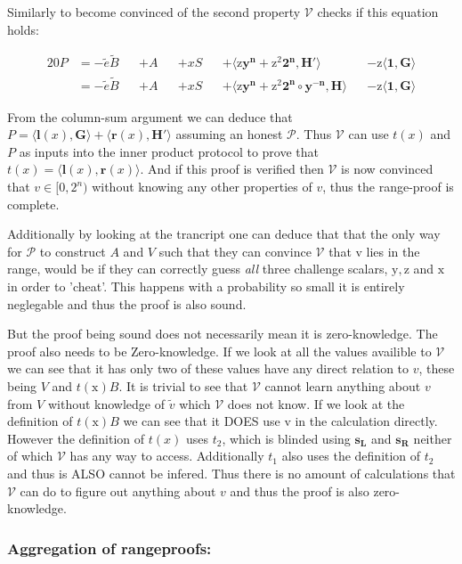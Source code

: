 \documentclass{article}
\newcommand{\eq}[1]{\begin{alignat*}{20}#1\end{alignat*}}
\renewcommand{\vec}[1]{\boldsymbol{#1}}
\newcommand{\ran}[1]{\mathrm{#1}}
\newcommand{\vecran}[1]{\mathbf{#1}}
\newcommand{\V}{\mathcal{V}}
\renewcommand{\P}{\mathcal{P}}
\newcommand{\tB}{\widetilde{B}}
\newcommand{\tv}{\widetilde{v}}
\newcommand{\dotp}[2]{\langle #1, #2 \rangle}
\begin{document}
Similarly to become convinced of the second property $\V$ checks if this equation holds:

\eq{
	P &= -\widetilde{e}\tB &&+ A &&+ xS &&+ \dotp{\ran{z}\vecran{y^n} + \ran{z^2}\vec{2^n}}{\vec{H'}} &&- \ran{z}\dotp{\vec{1}}{\vec{\vec{G}}} \\
	&= -\widetilde{e}\tB &&+ A &&+ xS &&+ \dotp{\ran{z}\vecran{y^n} + \ran{z^2}\vec{2^n}\circ\vecran{y^{-n}}}{\vec{H}} &&- \ran{z}\dotp{\vec{1}}{\vec{G}}
}

From the column-sum argument we can deduce that $P = \dotp{\vec{l}(x)}{\vec{G}} + \dotp{\vec{r}(x)}{\vec{H'}}$ assuming an honest $\P$. Thus $\V$ can use $t(x)$ and $P$ as inputs into the inner product protocol to prove that $ t(x) = \dotp{\vec{l}(x)}{\vec{r}(x)}$. And if this proof is verified then $\V$ is now convinced that $v\in [0,2^n)$ without knowing any other properties of $v$, thus the range-proof is complete.

Additionally by looking at the trancript one can deduce that that the only way for $\P$ to construct $A$ and $V$ such that they can convince $\V$ that v lies in the range, would be if they can correctly guess \textit{all} three challenge scalars, $\ran{y}, \ran{z}$ and $\ran{x}$ in order to 'cheat'. This happens with a probability so small it is entirely neglegable and thus the proof is also sound.

But the proof being sound does not necessarily mean it is zero-knowledge. The proof also needs to be Zero-knowledge. If we look at all the values availible to $\V$ we can see that it has only two of these values have any direct relation to $v$, these being $V$ and $t(\ran{x})B$. It is trivial to see that $\V$ cannot learn anything about $v$ from $V$ without knowledge of $\tv$ which $\V$ does not know. If we look at the definition of $t(\ran{x})B$ we can see that it DOES use v in the calculation directly. However the definition of $t(x)$ uses $t_2$, which is blinded using $\vecran{s_L}$ and $\vecran{s_R}$ neither of which $\V$ has any way to access. Additionally $t_1$ also uses the definition of $t_2$ and thus is ALSO cannot be infered. Thus there is no amount of calculations that $\V$ can do to figure out anything about $v$ and thus the proof is also zero-knowledge.

\subsubsection{Aggregation of rangeproofs:}
\end{document}
